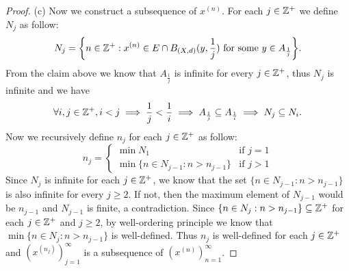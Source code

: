 \begin{proof}{(c)}
  Now we construct a subsequence of \(x^{(n)}\).
  For each \(j \in \mathbb{Z}^+\) we define \(N_j\) as follow:
  \[
    N_j = \bigg\{n \in \mathbb{Z}^+ : x^{(n)} \in E \cap B_{(X, d)}(y, \frac{1}{j}) \text{ for some } y \in A_{\frac{1}{j}}\bigg\}.
  \]
  From the claim above we know that \(A_{\frac{1}{j}}\) is infinite for every \(j \in \mathbb{Z}^+\), thus \(N_j\) is infinite and we have
  \[
    \forall i, j \in \mathbb{Z}^+, i < j \implies \frac{1}{j} < \frac{1}{i} \implies A_{\frac{1}{j}} \subseteq A_{\frac{1}{i}} \implies N_j \subseteq N_i.
  \]
  Now we recursively define \(n_j\) for each \(j \in \mathbb{Z}^+\) as follow:
  \[
    n_j = \begin{cases}
      \min N_1                                & \text{if } j = 1 \\
      \min\{n \in N_{j - 1} : n > n_{j - 1}\} & \text{if } j > 1
    \end{cases}
  \]
  Since \(N_j\) is infinite for each \(j \in \mathbb{Z}^+\), we know that the set \(\{n \in N_{j - 1} : n > n_{j - 1}\}\) is also infinite for every \(j \geq 2\).
  If not, then the maximum element of \(N_{j - 1}\) would be \(n_{j - 1}\) and \(N_{j - 1}\) is finite, a contradiction.
  Since \(\{n \in N_j : n > n_{j - 1}\} \subseteq \mathbb{Z}^+\) for each \(j \in \mathbb{Z}^+\) and \(j \geq 2\), by well-ordering principle we know that \(\min\{n \in N_j : n > n_{j - 1}\}\) is well-defined.
  Thus \(n_j\) is well-defined for each \(j \in \mathbb{Z}^+\) and \((x^{(n_j)})_{j = 1}^\infty\) is a subsequence of \((x^{(n)})_{n = 1}^\infty\).


\end{proof}
